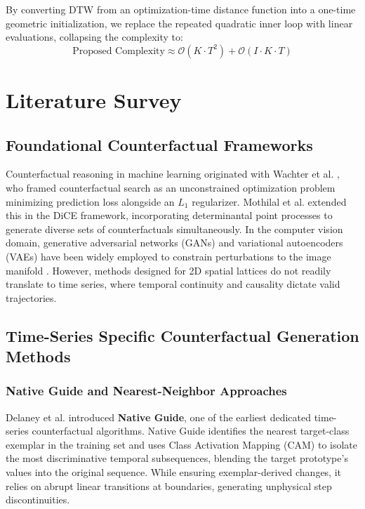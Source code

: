 \documentclass[11pt,a4paper]{report}
\begin{document}
By converting DTW from an optimization-time distance function into a one-time geometric initialization, we replace the repeated quadratic inner loop with linear evaluations, collapsing the complexity to:
\begin{equation}
    \text{Proposed Complexity} \approx \mathcal{O}(K \cdot T^2) + \mathcal{O}(I \cdot K \cdot T)
\end{equation}

\chapter{Literature Survey}

\section{Foundational Counterfactual Frameworks}
Counterfactual reasoning in machine learning originated with Wachter et al. \cite{wachter2017counterfactual}, who framed counterfactual search as an unconstrained optimization problem minimizing prediction loss alongside an $L_1$ regularizer. Mothilal et al. \cite{mothilal2020explaining} extended this in the DiCE framework, incorporating determinantal point processes to generate diverse sets of counterfactuals simultaneously. In the computer vision domain, generative adversarial networks (GANs) and variational autoencoders (VAEs) have been widely employed to constrain perturbations to the image manifold \cite{dhurandhar2018explanations, van2021interpretable}. However, methods designed for 2D spatial lattices do not readily translate to time series, where temporal continuity and causality dictate valid trajectories.

\section{Time-Series Specific Counterfactual Generation Methods}
\subsection{Native Guide and Nearest-Neighbor Approaches}
Delaney et al. \cite{delaney2021instance} introduced \textbf{Native Guide}, one of the earliest dedicated time-series counterfactual algorithms. Native Guide identifies the nearest target-class exemplar in the training set and uses Class Activation Mapping (CAM) to isolate the most discriminative temporal subsequences, blending the target prototype's values into the original sequence. While ensuring exemplar-derived changes, it relies on abrupt linear transitions at boundaries, generating unphysical step discontinuities.
\end{document}
